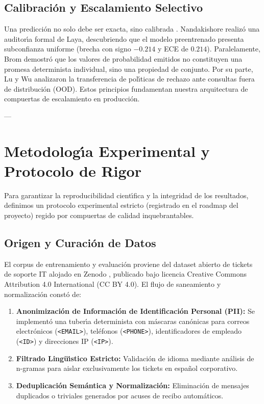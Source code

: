 \documentclass[10pt,journal,compsoc]{IEEEtran}
\begin{document}
\subsection{Calibraci\'on y Escalamiento Selectivo}
Una predicci\'on no solo debe ser exacta, sino calibrada \cite{guo2017calibration}. Nandakishore \cite{nandakishore2026laya} realiz\'o una auditor\'{\i}a formal de Laya, descubriendo que el modelo preentrenado presenta subconfianza uniforme (brecha con signo $-0.214$ y ECE de $0.214$). Paralelamente, Brom \cite{brom2026confidence} demostr\'o que los valores de probabilidad emitidos no constituyen una promesa determinista individual, sino una propiedad de conjunto. Por su parte, Lu y Wu \cite{lu2026benchmarking} analizaron la transferencia de pol\'{\i}ticas de rechazo ante consultas fuera de distribuci\'on (OOD). Estos principios fundamentan nuestra arquitectura de compuertas de escalamiento en producci\'on.

---

\section{Metodolog\'{\i}a Experimental y Protocolo de Rigor}

Para garantizar la reproducibilidad cient\'{\i}fica y la integridad de los resultados, definimos un protocolo experimental estricto (registrado en el roadmap del proyecto) regido por compuertas de calidad inquebrantables.

\subsection{Origen y Curaci\'on de Datos}
El corpus de entrenamiento y evaluaci\'on proviene del dataset abierto de tickets de soporte IT alojado en Zenodo \cite{zenodo_tickets2024}, publicado bajo licencia Creative Commons Attribution 4.0 International (CC BY 4.0).
El flujo de saneamiento y normalizaci\'on const\'o de:
\begin{enumerate}
    \item \textbf{Anonimizaci\'on de Informaci\'on de Identificaci\'on Personal (PII):} Se implement\'o una tuber\'{\i}a determinista con m\'ascaras can\'onicas para correos electr\'onicos (\texttt{<EMAIL>}), tel\'efonos (\texttt{<PHONE>}), identificadores de empleado (\texttt{<ID>}) y direcciones IP (\texttt{<IP>}).
    \item \textbf{Filtrado Ling\"u\'{\i}stico Estricto:} Validaci\'on de idioma mediante an\'alisis de n-gramas para aislar exclusivamente los tickets en espa\~nol corporativo.
    \item \textbf{Deduplicaci\'on Sem\'antica y Normalizaci\'on:} Eliminaci\'on de mensajes duplicados o triviales generados por acuses de recibo autom\'aticos.
\end{enumerate}
\end{document}
